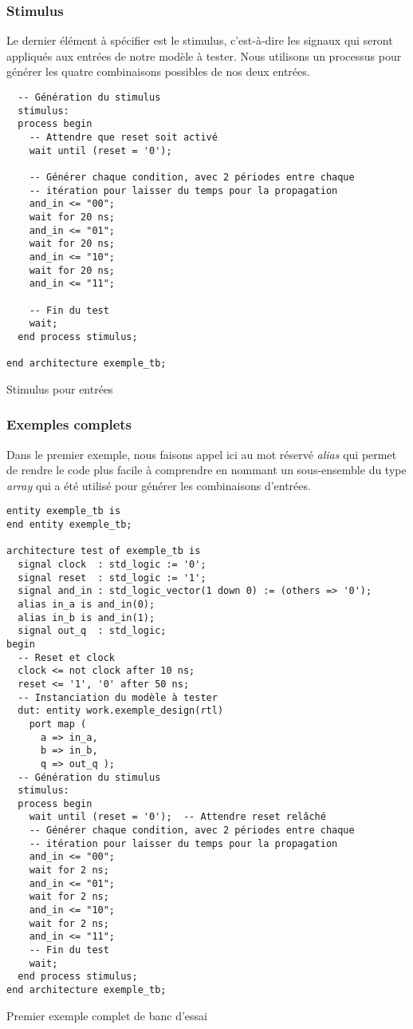 \documentclass[11pt]{article}
\begin{document}
\subsubsection{Stimulus}
\label{sec:org2924529}

Le dernier élément à spécifier est le stimulus, c'est-à-dire les
signaux qui seront appliqués aux entrées de notre modèle à
tester. Nous utilisons un processus pour générer les quatre
combinaisons possibles de nos deux entrées.

\begin{listing}[htbp]
\begin{verbatim}
  -- Génération du stimulus
  stimulus:
  process begin
    -- Attendre que reset soit activé
    wait until (reset = '0');

    -- Générer chaque condition, avec 2 périodes entre chaque
    -- itération pour laisser du temps pour la propagation
    and_in <= "00";
    wait for 20 ns;
    and_in <= "01";
    wait for 20 ns;
    and_in <= "10";
    wait for 20 ns;
    and_in <= "11";

    -- Fin du test
    wait;
  end process stimulus;

end architecture exemple_tb;
\end{verbatim}
\caption{Stimulus pour entrées}
\end{listing}

\subsubsection{Exemples complets}
\label{sec:org5588228}

Dans le premier exemple, nous faisons appel ici au mot réservé \emph{alias}
qui permet de rendre le code plus facile à comprendre en nommant un
sous-ensemble du type \emph{array} qui a été utilisé pour générer les
combinaisons d'entrées.

\begin{listing}[htbp]
\begin{verbatim}
entity exemple_tb is
end entity exemple_tb;

architecture test of exemple_tb is
  signal clock  : std_logic := '0';
  signal reset  : std_logic := '1';
  signal and_in : std_logic_vector(1 down 0) := (others => '0');
  alias in_a is and_in(0);
  alias in_b is and_in(1);
  signal out_q  : std_logic;
begin
  -- Reset et clock
  clock <= not clock after 10 ns;
  reset <= '1', '0' after 50 ns;
  -- Instanciation du modèle à tester 
  dut: entity work.exemple_design(rtl)
    port map (
      a => in_a,
      b => in_b,
      q => out_q );
  -- Génération du stimulus
  stimulus:
  process begin
    wait until (reset = '0');  -- Attendre reset relâché
    -- Générer chaque condition, avec 2 périodes entre chaque
    -- itération pour laisser du temps pour la propagation
    and_in <= "00";
    wait for 2 ns;
    and_in <= "01";
    wait for 2 ns;
    and_in <= "10";
    wait for 2 ns;
    and_in <= "11";
    -- Fin du test
    wait;
  end process stimulus;
end architecture exemple_tb;
\end{verbatim}
\caption{Premier exemple complet de banc d'essai}
\end{listing}
\end{document}
